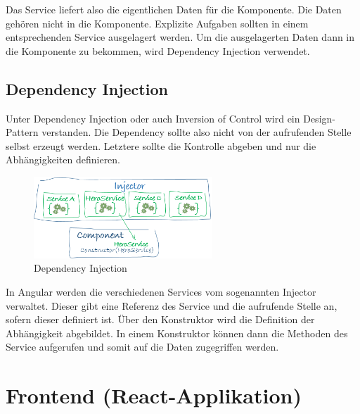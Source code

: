 Das Service liefert also die eigentlichen Daten für die Komponente. Die Daten gehören nicht in die Komponente. Explizite Aufgaben sollten in einem entsprechenden Service ausgelagert werden. Um die ausgelagerten Daten dann in die Komponente zu bekommen, wird Dependency Injection verwendet.

\subsection{Dependency Injection}
Unter Dependency Injection oder auch Inversion of Control wird ein Design-Pattern verstanden. Die Dependency sollte also nicht von der aufrufenden Stelle selbst erzeugt werden. Letztere sollte die Kontrolle abgeben und nur die Abhängigkeiten definieren. 

\begin{figure}
  \centering
  \includegraphics[width=0.6\textwidth]{./pics/DependencyInjection.png}
  \caption{Dependency Injection}
\end{figure}
\pagebreak
In Angular werden die verschiedenen Services vom sogenannten Injector verwaltet. Dieser gibt eine Referenz des Service und die aufrufende Stelle an, sofern dieser definiert ist. Über den Konstruktor wird die Definition der Abhängigkeit abgebildet. In einem Konstruktor können dann die Methoden des Service aufgerufen und somit auf die Daten zugegriffen werden.
\cite{AngularService}

\section{Frontend (React-Applikation)}
